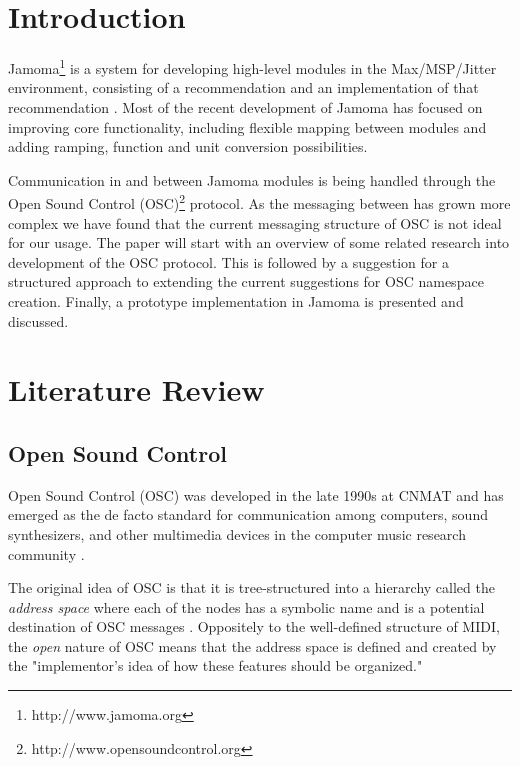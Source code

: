 \documentclass{sig-alternate}
\begin{document}


\section{Introduction}

Jamoma\footnote{http://www.jamoma.org} is a system for developing high-level modules in the Max/MSP/Jitter environment, consisting of a recommendation and an implementation of that recommendation  \cite{Place:2006}. Most of the recent development of Jamoma has focused on improving core functionality, including flexible mapping between modules and adding ramping, function and unit conversion possibilities. 

Communication in and between Jamoma modules is being handled through the Open Sound Control (OSC)\footnote{http://www.opensoundcontrol.org} protocol. As the messaging between has grown more complex we have found that the current messaging structure of OSC is not ideal for our usage. The paper will start with an overview of some related research into development of the OSC protocol. This is followed by a suggestion for a structured approach to extending the current suggestions for OSC namespace creation. Finally, a prototype implementation in Jamoma is presented and discussed.


\section{Literature Review}


\subsection{Open Sound Control}

Open Sound Control (OSC) was developed in the late 1990s at CNMAT and has emerged as the de facto standard for communication among computers, sound synthesizers, and other multimedia devices in the computer music research community \cite{Wright:2003}. 


The original idea of OSC is that it is tree-structured into a hierarchy called the \emph{address space} where each of the nodes has a symbolic name and is a potential destination of OSC messages \cite{Wright:2003}. Oppositely to the well-defined structure of MIDI, the \emph{open} nature of OSC means that the address space is defined and created by the "implementor’s idea of how these features should be organized." 
\end{document}
